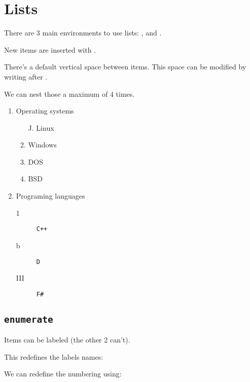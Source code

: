 \section{Lists}

There are 3 main environments to use lists: , 
and .

New items are inserted with \coden{\item[sym]}. 

There's a default vertical space between items.
This space can be modified by writing \code{\setlength{\itemsep}{5mm}} after \code{\begin{env}}.

We can nest those a maximum of 4 times.

\begin{example}
\begin{enumerate}
  \item Operating systems
  \begin{enumerate}\setlength{\itemsep}{0mm}
  \item[J.] Linux
  \item Windows
  \item DOS
  \item BSD
  \end{enumerate}
\item Programing languages
  \begin{description}
    \item[1] \texttt{C++}
    \item[b] \texttt{D}
    \item[III] \texttt{F\#}
  \end{description}
\end{enumerate}
\end{example}


\subsection{\texttt{enumerate}}
Items can be labeled (the other 2 can't).

This redefines the labels names:
\begin{latex}
\renewcommand{\labelenumi}{\Roman{enumi}.}
\renewcommand{\labelenumii}{(\arabic{enumii})}
\renewcommand{\labelenumiii}{(\alph{enumiii})}
\renewcommand{\labelenumiv}{(\roman{enumiv})}
\end{latex}

We can redefine the numbering using:
\begin{latex}
\renewcommand{\theenumi}{\Roman{enumi}.}
\renewcommand{\theenumii}{(\arabic{enumii})}
\renewcommand{\theenumiii}{(\alph{enumiii})}
\renewcommand{\theenumiv}{(\roman{enumiv})}
\end{latex}

